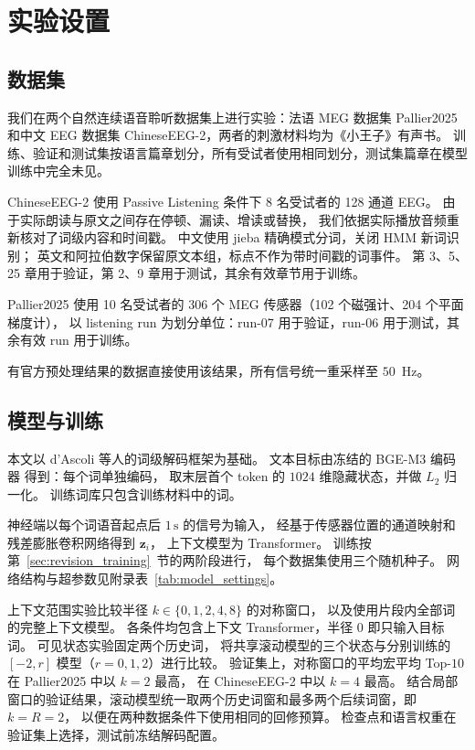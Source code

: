 \section{实验设置}

\subsection{数据集}

我们在两个自然连续语音聆听数据集上进行实验：法语 MEG 数据集 Pallier2025 和中文 EEG 数据集 ChineseEEG-2，两者的刺激材料均为《小王子》有声书。
训练、验证和测试集按语言篇章划分，所有受试者使用相同划分，测试集篇章在模型训练中完全未见。

ChineseEEG-2\cite{chen2026chineseeeg2} 使用 Passive Listening 条件下 8 名受试者的 128 通道 EEG。
由于实际朗读与原文之间存在停顿、漏读、增读或替换，
我们依据实际播放音频重新核对了词级内容和时间戳。
中文使用 jieba 精确模式分词，关闭 HMM 新词识别；
英文和阿拉伯数字保留原文本组，标点不作为带时间戳的词事件。
第 3、5、25 章用于验证，第 2、9 章用于测试，其余有效章节用于训练。

Pallier2025\cite{openneuro_pallier2025_listening,dascoli2025word} 使用 10 名受试者的 306 个 MEG 传感器（102 个磁强计、204 个平面梯度计），
以 listening run 为划分单位：run-07 用于验证，run-06 用于测试，其余有效 run 用于训练。

有官方预处理结果的数据直接使用该结果，所有信号统一重采样至 $50$~Hz。


\subsection{模型与训练}

本文以 d'Ascoli 等人的词级解码框架为基础\cite{dascoli2025word}。
文本目标由冻结的 BGE-M3 编码器\cite{chen2024bgem3} 得到：每个词单独编码，
取末层首个 token 的 $1024$ 维隐藏状态，并做 $L_2$ 归一化。
训练词库只包含训练材料中的词。

神经端以每个词语音起点后 $1\,\mathrm{s}$ 的信号为输入，
经基于传感器位置的通道映射和残差膨胀卷积网络得到 $\mathbf z_i$，
上下文模型为 Transformer。
训练按第~\ref{sec:revision_training}~节的两阶段进行，
每个数据集使用三个随机种子。
网络结构与超参数见附录表~\ref{tab:model_settings}。

上下文范围实验比较半径 $k\in\{0,1,2,4,8\}$ 的对称窗口，
以及使用片段内全部词的完整上下文模型。
各条件均包含上下文 Transformer，半径 $0$ 即只输入目标词。
可见状态实验固定两个历史词，
将共享滚动模型的三个状态与分别训练的 $[-2,r]$ 模型（$r=0,1,2$）进行比较。
验证集上，对称窗口的平均宏平均 Top-$10$ 在 Pallier2025 中以 $k=2$ 最高，
在 ChineseEEG-2 中以 $k=4$ 最高。
结合局部窗口的验证结果，滚动模型统一取两个历史词窗和最多两个后续词窗，即 $k=R=2$，
以便在两种数据条件下使用相同的回修预算。
检查点和语言权重在验证集上选择，测试前冻结解码配置。

